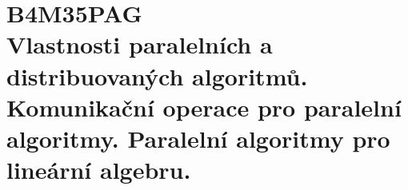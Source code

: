 \chapter[Paralelní algoritmy]{B4M35PAG \\[1ex]\Large{Vlastnosti paralelních a distribuovaných algoritmů. Komunikační operace pro paralelní algoritmy. Paralelní algoritmy pro lineární algebru. \textbf{}}}



